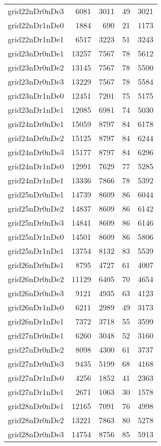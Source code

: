\documentclass[../../../thesis.tex]{subfiles}
\begin{document}
\begin{longtable}{lrrrr}
grid22nDr0nDe3 & 6081 & 3011 & 49 & 3021 \\
grid22nDr1nDe0 & 1884 & 690 & 21 & 1173 \\
grid22nDr1nDe1 & 6517 & 3223 & 51 & 3243 \\
grid23nDr0nDe1 & 13257 & 7567 & 78 & 5612 \\
grid23nDr0nDe2 & 13145 & 7567 & 78 & 5500 \\
grid23nDr0nDe3 & 13229 & 7567 & 78 & 5584 \\
grid23nDr1nDe0 & 12451 & 7201 & 75 & 5175 \\
grid23nDr1nDe1 & 12085 & 6981 & 74 & 5030 \\
grid24nDr0nDe1 & 15059 & 8797 & 84 & 6178 \\
grid24nDr0nDe2 & 15125 & 8797 & 84 & 6244 \\
grid24nDr0nDe3 & 15177 & 8797 & 84 & 6296 \\
grid24nDr1nDe0 & 12991 & 7629 & 77 & 5285 \\
grid24nDr1nDe1 & 13336 & 7866 & 78 & 5392 \\
grid25nDr0nDe1 & 14739 & 8609 & 86 & 6044 \\
grid25nDr0nDe2 & 14837 & 8609 & 86 & 6142 \\
grid25nDr0nDe3 & 14841 & 8609 & 86 & 6146 \\
grid25nDr1nDe0 & 14501 & 8609 & 86 & 5806 \\
grid25nDr1nDe1 & 13754 & 8132 & 83 & 5539 \\
grid26nDr0nDe1 & 8795 & 4727 & 61 & 4007 \\
grid26nDr0nDe2 & 11129 & 6405 & 70 & 4654 \\
grid26nDr0nDe3 & 9121 & 4935 & 63 & 4123 \\
grid26nDr1nDe0 & 6211 & 2989 & 49 & 3173 \\
grid26nDr1nDe1 & 7372 & 3718 & 55 & 3599 \\
grid27nDr0nDe1 & 6260 & 3048 & 52 & 3160 \\
grid27nDr0nDe2 & 8098 & 4300 & 61 & 3737 \\
grid27nDr0nDe3 & 9435 & 5199 & 68 & 4168 \\
grid27nDr1nDe0 & 4256 & 1852 & 41 & 2363 \\
grid27nDr1nDe1 & 2671 & 1063 & 30 & 1578 \\
grid28nDr0nDe1 & 12165 & 7091 & 76 & 4998 \\
grid28nDr0nDe2 & 13221 & 7863 & 80 & 5278 \\
grid28nDr0nDe3 & 14754 & 8756 & 85 & 5913 \\

\end{longtable}
\end{document}
